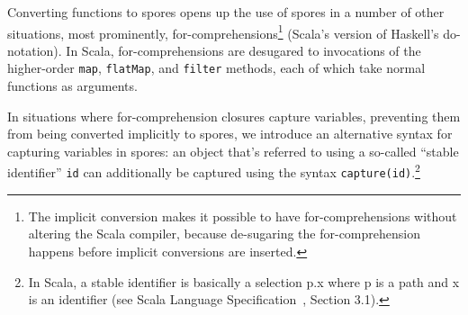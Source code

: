 \documentclass{llncs}
\begin{document}
Converting functions to spores opens up the use of spores in a number of other
situations, most prominently, for-comprehensions\footnote{The implicit
conversion makes it possible to have for-comprehensions without altering the
Scala compiler, because de-sugaring the for-comprehension happens before
implicit conversions are inserted.} (Scala's version of Haskell's do-
notation). In Scala, for-comprehensions are desugared to invocations of the
higher-order \verb|map|, \verb|flatMap|, and \verb|filter|
methods, each of which take normal functions as arguments.










In situations where for-comprehension closures capture variables, preventing
them from being converted implicitly to spores, we introduce an alternative
syntax for capturing variables in spores: an object that's referred to using a
so-called ``stable identifier'' \verb|id| can additionally be captured using
the syntax \verb|capture(id)|.\footnote{In Scala, a stable identifier is
basically a selection p.x where p is a path and x is an identifier (see Scala
Language Specification~\cite{ScalaSpec}, Section 3.1).}
\end{document}
